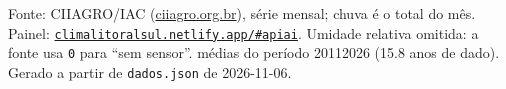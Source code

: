 \documentclass[10pt,a4paper]{article}
\begin{document}
\vspace{1pt}
{\tiny\color{cinza}
Fonte: CIIAGRO/IAC (\href{http://ciiagro.org.br}{ciiagro.org.br}), série mensal;
chuva é o total do mês. Painel:
\href{https://climalitoralsul.netlify.app/\#apiai}%
{\texttt{climalitoralsul.netlify.app/\#apiai}}.
Umidade relativa omitida: a fonte usa \texttt{0} para ``sem sensor''. 
médias do período 2011\textendash{}2026 (15.8 anos de dado).
Gerado a partir de \texttt{dados.json} de 2026-11-06.}
\end{document}
